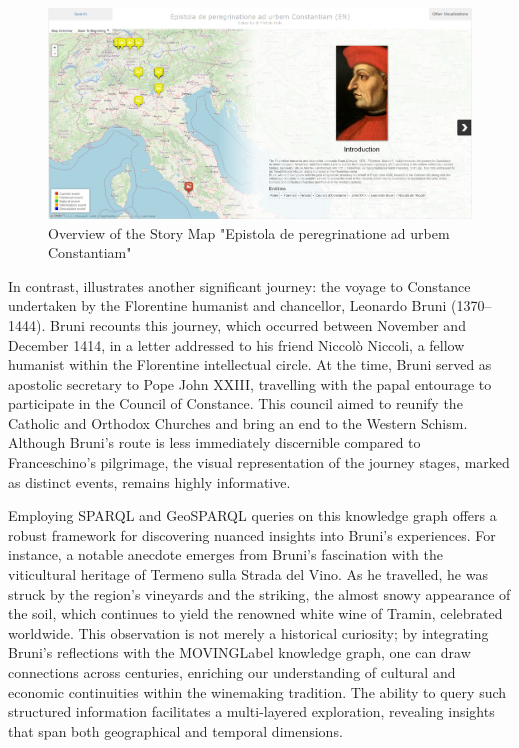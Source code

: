 \begin{figure}[h!tb]
    \centering
    \includegraphics[scale=0.3]{img/bruniOverview.png}
    \caption{Overview of the Story Map "Epistola de peregrinatione ad urbem Constantiam"}
    \label{fig:bruni}
\end{figure}


In contrast,  illustrates another significant journey: the voyage to Constance undertaken by the Florentine humanist and chancellor, Leonardo Bruni (1370–1444). Bruni recounts this journey, which occurred between November and December 1414, in a letter addressed to his friend Niccolò Niccoli, a fellow humanist within the Florentine intellectual circle. At the time, Bruni served as apostolic secretary to Pope John XXIII, travelling with the papal entourage to participate in the Council of Constance. This council aimed to reunify the Catholic and Orthodox Churches and bring an end to the Western Schism. Although Bruni's route is less immediately discernible compared to Franceschino's pilgrimage, the visual representation of the journey stages, marked as distinct events, remains highly informative. 

Employing SPARQL and GeoSPARQL queries on this knowledge graph offers a robust framework for discovering nuanced insights into Bruni's experiences. For instance, a notable anecdote emerges from Bruni’s fascination with the viticultural heritage of Termeno sulla Strada del Vino. As he travelled, he was struck by the region’s vineyards and the striking, the almost snowy appearance of the soil, which continues to yield the renowned white wine of Tramin, celebrated worldwide. This observation is not merely a historical curiosity; by integrating Bruni’s reflections with the \acrshort{MOVINGLabel} knowledge graph, one can draw connections across centuries, enriching our understanding of cultural and economic continuities within the winemaking tradition. The ability to query such structured information facilitates a multi-layered exploration, revealing insights that span both geographical and temporal dimensions.


